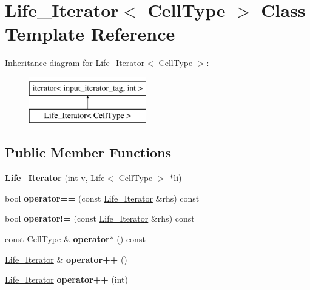 \hypertarget{classLife__Iterator}{\section{Life\-\_\-\-Iterator$<$ Cell\-Type $>$ Class Template Reference}
\label{classLife__Iterator}
}
Inheritance diagram for Life\-\_\-\-Iterator$<$ Cell\-Type $>$\-:\begin{figure}[H]
\begin{center}
\leavevmode
\includegraphics[height=2.000000cm]{classLife__Iterator}
\end{center}
\end{figure}
\subsection*{Public Member Functions}
\begin{DoxyCompactItemize}
\item 
\hypertarget{classLife__Iterator_a1cc454590f21bf60efa60008600e220e}{{\bfseries Life\-\_\-\-Iterator} (int v, \hyperlink{classLife}{Life}$<$ Cell\-Type $>$ $\ast$li)}\label{classLife__Iterator_a1cc454590f21bf60efa60008600e220e}

\item 
\hypertarget{classLife__Iterator_a96a44af672e18c95afdb49bfc8116273}{bool {\bfseries operator==} (const \hyperlink{classLife__Iterator}{Life\-\_\-\-Iterator} \&rhs) const }\label{classLife__Iterator_a96a44af672e18c95afdb49bfc8116273}

\item 
\hypertarget{classLife__Iterator_a3fae7afeb06ecdf6d2e6779a926c5b1a}{bool {\bfseries operator!=} (const \hyperlink{classLife__Iterator}{Life\-\_\-\-Iterator} \&rhs) const }\label{classLife__Iterator_a3fae7afeb06ecdf6d2e6779a926c5b1a}

\item 
\hypertarget{classLife__Iterator_a25f911f90ba7d3cf0f3190e33f5149e4}{const Cell\-Type \& {\bfseries operator$\ast$} () const }\label{classLife__Iterator_a25f911f90ba7d3cf0f3190e33f5149e4}

\item 
\hypertarget{classLife__Iterator_a24ab346197518ae395e7d55a106bc43c}{\hyperlink{classLife__Iterator}{Life\-\_\-\-Iterator} \& {\bfseries operator++} ()}\label{classLife__Iterator_a24ab346197518ae395e7d55a106bc43c}

\item 
\hypertarget{classLife__Iterator_a5dda74f118e048f7c263a19ee57dd4a7}{\hyperlink{classLife__Iterator}{Life\-\_\-\-Iterator} {\bfseries operator++} (int)}\label{classLife__Iterator_a5dda74f118e048f7c263a19ee57dd4a7}

\end{DoxyCompactItemize}

